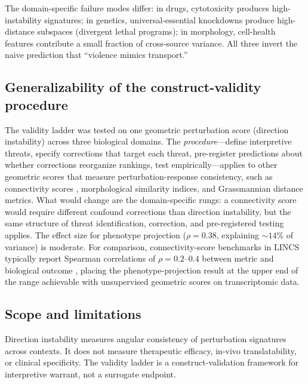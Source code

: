 \documentclass[11pt]{article}
\begin{document}
The domain-specific failure modes differ: in drugs, cytotoxicity
produces high-instability signatures; in genetics, universal-essential
knockdowns produce high-distance subspaces (divergent lethal programs);
in morphology, cell-health features contribute a small fraction of
cross-source variance. All three invert the naive prediction that
``violence mimics transport.''

\subsection{Generalizability of the construct-validity procedure}

The validity ladder was tested on one geometric perturbation score
(direction instability) across three biological domains. The
\emph{procedure}---define interpretive threats, specify corrections
that target each threat, pre-register predictions about whether
corrections reorganize rankings, test empirically---applies to other
geometric scores that measure perturbation-response consistency, such as
connectivity scores \citep{subramanian2017next}, morphological similarity
indices, and Grassmannian distance metrics. What would change are the
domain-specific rungs: a connectivity score would require different
confound corrections than direction instability, but the same
structure of threat identification, correction, and pre-registered
testing applies. The effect size for phenotype projection ($\rho = 0.38$,
explaining ${\sim}14\%$ of variance) is moderate. For comparison,
connectivity-score benchmarks in LINCS typically report Spearman
correlations of $\rho = 0.2$--$0.4$ between metric and biological
outcome \citep{li2020comprehensive}, placing the phenotype-projection
result at the upper end of the range achievable with unsupervised
geometric scores on transcriptomic data.

\subsection{Scope and limitations}

Direction instability measures angular consistency of perturbation signatures
across contexts. It does not measure therapeutic efficacy, in-vivo
translatability, or clinical specificity. The validity ladder is a
construct-validation framework for interpretive warrant, not a surrogate
endpoint.
\end{document}
